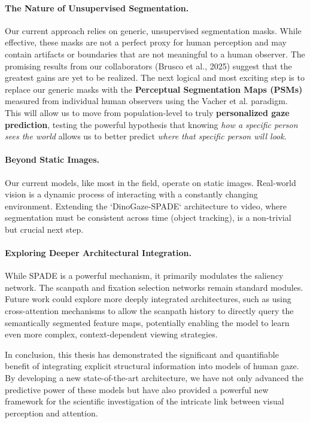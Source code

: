 \paragraph{The Nature of Unsupervised Segmentation.} Our current approach relies on generic, unsupervised segmentation masks. While effective, these masks are not a perfect proxy for human perception and may contain artifacts or boundaries that are not meaningful to a human observer. The promising results from our collaborators (Brusco et al., 2025) suggest that the greatest gains are yet to be realized. The next logical and most exciting step is to replace our generic masks with the \textbf{Perceptual Segmentation Maps (PSMs)} measured from individual human observers using the Vacher et al. paradigm. This will allow us to move from population-level to truly \textbf{personalized gaze prediction}, testing the powerful hypothesis that knowing \textit{how a specific person sees the world} allows us to better predict \textit{where that specific person will look}.

\paragraph{Beyond Static Images.} Our current models, like most in the field, operate on static images. Real-world vision is a dynamic process of interacting with a constantly changing environment. Extending the `DinoGaze-SPADE` architecture to video, where segmentation must be consistent across time (object tracking), is a non-trivial but crucial next step.

\paragraph{Exploring Deeper Architectural Integration.} While SPADE is a powerful mechanism, it primarily modulates the saliency network. The scanpath and fixation selection networks remain standard modules. Future work could explore more deeply integrated architectures, such as using cross-attention mechanisms to allow the scanpath history to directly query the semantically segmented feature maps, potentially enabling the model to learn even more complex, context-dependent viewing strategies.

In conclusion, this thesis has demonstrated the significant and quantifiable benefit of integrating explicit structural information into models of human gaze. By developing a new state-of-the-art architecture, we have not only advanced the predictive power of these models but have also provided a powerful new framework for the scientific investigation of the intricate link between visual perception and attention.